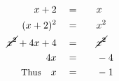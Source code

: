 \begin{alignat*}{5}
&\,&x+2\quad&=\quad&&x\\
&\,&(x+2)^2\quad&=&& x^2\\
&\,&\cancel{x^2}+4x+4\quad&=&&\cancel{x^2}\\
&\,&4x\quad&=&&-4\\
&\,&\small\text{Thus}\normalsize\quad x\quad&=&&-1
\end{alignat*}
